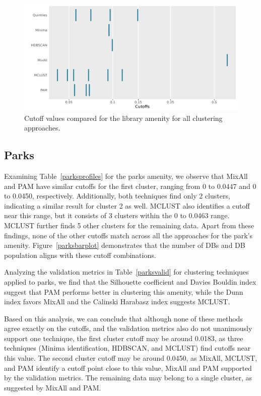 \documentclass[11pt, a4paper]{article}
\begin{document}
\begin{figure}[H]
\centering
\includegraphics[width=\textwidth]{./cutoff_ticks/Library_ticks.png}
\caption[Library cutoff comparison]{Cutoff values compared for the library amenity for all clustering approaches.}\label{libraryticks}
\end{figure}










\pagebreak
\justifying
\subsection{Parks}

Examining Table~\ref{parksprofiles} for the parks amenity, we observe that MixAll and PAM have similar cutoffs for the first cluster, ranging from 0 to 0.0447 and 0 to 0.0450, respectively. Additionally, both techniques find only 2 clusters, indicating a similar result for cluster 2 as well. MCLUST also identifies a cutoff near this range, but it consists of 3 clusters within the 0 to 0.0463 range. MCLUST further finds 5 other clusters for the remaining data. Apart from these findings, none of the other cutoffs match across all the approaches for the park's amenity. Figure~\ref{parksbarplot} demonstrates that the number of DBs and DB population aligns with these cutoff combinations.
\par
Analyzing the validation metrics in Table~\ref{parksvalid} for clustering techniques applied to parks, we find that the Silhouette coefficient and Davies Bouldin index suggest that PAM performs better in clustering this amenity, while the Dunn index favors MixAll and the Calinski Harabasz index suggests MCLUST.
\par
Based on this analysis, we can conclude that although none of these methods agree exactly on the cutoffs, and the validation metrics also do not unanimously support one technique, the first cluster cutoff may be around 0.0183, as three techniques (Minima identification, HDBSCAN, and MCLUST) find cutoffs near this value. The second cluster cutoff may be around 0.0450, as MixAll, MCLUST, and PAM identify a cutoff point close to this value, MixAll and PAM supported by the validation metrics. The remaining data may belong to a single cluster, as suggested by MixAll and PAM.
\end{document}
